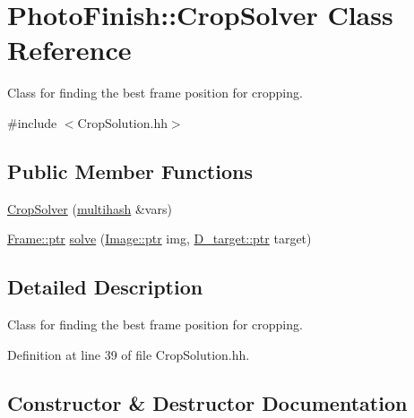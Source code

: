 \hypertarget{class_photo_finish_1_1_crop_solver}{}\section{Photo\+Finish\+:\+:Crop\+Solver Class Reference}
\label{class_photo_finish_1_1_crop_solver}


Class for finding the best frame position for cropping.  




{\ttfamily \#include $<$Crop\+Solution.\+hh$>$}

\subsection*{Public Member Functions}
\begin{DoxyCompactItemize}
\item 
\hyperlink{class_photo_finish_1_1_crop_solver_abf0fd898ce997476dec6cd9998c8ce2c}{Crop\+Solver} (\hyperlink{namespace_photo_finish_a6f41796f162687538b7da5c7a95e2d18}{multihash} \&vars)
\item 
\hyperlink{class_photo_finish_1_1_frame_aaf5eaa56b8096024c0d45ad9e7f5e6c1}{Frame\+::ptr} \hyperlink{class_photo_finish_1_1_crop_solver_a04f0f268ad8a51da6183121d2b1de9cc}{solve} (\hyperlink{class_photo_finish_1_1_image_ab336203305ed3a1397d7245063353b5a}{Image\+::ptr} img, \hyperlink{class_photo_finish_1_1_d__target_a44befb9c758d25b0c765e97caa1caa39}{D\+\_\+target\+::ptr} target)
\end{DoxyCompactItemize}


\subsection{Detailed Description}
Class for finding the best frame position for cropping. 

Definition at line 39 of file Crop\+Solution.\+hh.



\subsection{Constructor \& Destructor Documentation}
\mbox{\label{class_photo_finish_1_1_crop_solver_abf0fd898ce997476dec6cd9998c8ce2c}} 
